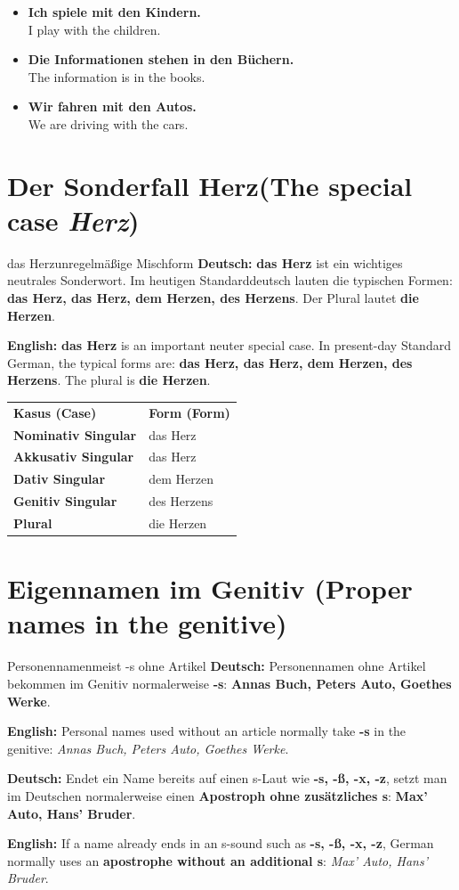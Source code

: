 \documentclass[a4paper,11pt]{article}
\newcommand{\GermanText}[1]{\textbf{Deutsch: }#1\par}
\newcommand{\EnglishText}[1]{{\small\color{SoftGray}\textbf{English: }#1\par}}
\newcommand{\ExampleItem}[2]{\item \textbf{#1}\\{\small\color{SoftGray}#2}}
\begin{document}
\begin{exbox}
\begin{itemize}
\ExampleItem{Ich spiele mit den Kindern.}{I play with the children.}
\ExampleItem{Die Informationen stehen in den Büchern.}{The information is in the books.}
\ExampleItem{Wir fahren mit den Autos.}{We are driving with the cars.}
\end{itemize}
\end{exbox}

\section{Der Sonderfall \glqq Herz\grqq \textnormal{(The special case \emph{Herz})}}
\begin{grammarentry}{das Herz}{unregelmäßige Mischform}
\GermanText{\textbf{das Herz} ist ein wichtiges neutrales Sonderwort. Im heutigen Standarddeutsch lauten die typischen Formen: \textbf{das Herz, das Herz, dem Herzen, des Herzens}. Der Plural lautet \textbf{die Herzen}.}
\EnglishText{\textbf{das Herz} is an important neuter special case. In present-day Standard German, the typical forms are: \textbf{das Herz, das Herz, dem Herzen, des Herzens}. The plural is \textbf{die Herzen}.}
\end{grammarentry}

\begin{longtable}{>{\bfseries}p{4cm}|p{7cm}}
\rowcolor{HeaderBlueDark}
\color{white}\textbf{Kasus (Case)} &
\color{white}\textbf{Form (Form)} \\
Nominativ Singular & das Herz \\
Akkusativ Singular & das Herz \\
Dativ Singular & dem Herzen \\
Genitiv Singular & des Herzens \\
Plural & die Herzen \\
\end{longtable}

\section{Eigennamen im Genitiv \textnormal{(Proper names in the genitive)}}
\begin{grammarentry}{Personennamen}{meist -s ohne Artikel}
\GermanText{Personennamen ohne Artikel bekommen im Genitiv normalerweise \textbf{-s}: \textbf{Annas Buch, Peters Auto, Goethes Werke}.}
\EnglishText{Personal names used without an article normally take \textbf{-s} in the genitive: \emph{Annas Buch, Peters Auto, Goethes Werke}.}

\GermanText{Endet ein Name bereits auf einen s-Laut wie \textbf{-s, -ß, -x, -z}, setzt man im Deutschen normalerweise einen \textbf{Apostroph ohne zusätzliches s}: \textbf{Max' Auto, Hans' Bruder}.}
\EnglishText{If a name already ends in an s-sound such as \textbf{-s, -ß, -x, -z}, German normally uses an \textbf{apostrophe without an additional s}: \emph{Max' Auto, Hans' Bruder}.}
\end{grammarentry}
\end{document}
